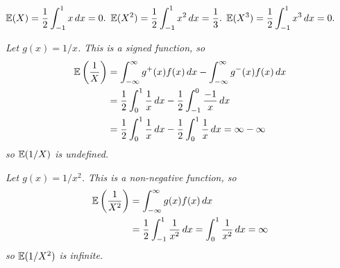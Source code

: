 \begin{exercise}
\begin{questions}
\begin{answer}
\ben
\it %
$\displaystyle\mathbb{E}(X) = \frac{1}{2}\int_{-1}^1 x\,dx = 0.$
%
\it %
$\displaystyle\mathbb{E}(X^2) = \frac{1}{2}\int_{-1}^1 x^2\,dx = \frac{1}{3}.$
%
\it %
$\displaystyle\mathbb{E}(X^3) = \frac{1}{2}\int_{-1}^1 x^3\,dx = 0.$

\it %
Let $g(x) = 1/x$. This is a signed function, so
\begin{align*}
\mathbb{E}\left(\frac{1}{X}\right)
	& = \int_{-\infty}^{\infty} g^{+}(x)f(x)\,dx - \int_{-\infty}^{\infty} g^{-}(x) f(x)\,dx \\
	& = \frac{1}{2}\int_0^1 \frac{1}{x}\,dx - \frac{1}{2}\int_{-1}^0 \frac{-1}{x}\,dx \\
	& = \frac{1}{2}\int_0^1 \frac{1}{x}\,dx - \frac{1}{2}\int_{0}^{1} \frac{1}{x}\,dx 
	= \infty - \infty
\end{align*}
so $\mathbb{E}(1/X)$ is undefined.

\it %
Let $g(x) = 1/x^2$. This is a non-negative function, so
\begin{align*}
\mathbb{E}\left(\frac{1}{X^2}\right)
	& = \int_{-\infty}^{\infty} g(x)f(x)\,dx \\
	& = \frac{1}{2}\int_{-1}^{1} \frac{1}{x^2}\,dx
	= \int_{0}^{1}\frac{1}{x^2}\,dx
	= \infty
\end{align*}
so $\mathbb{E}(1/X^2)$ is infinite.
\een
\end{answer} 


\end{questions}
\end{exercise}
